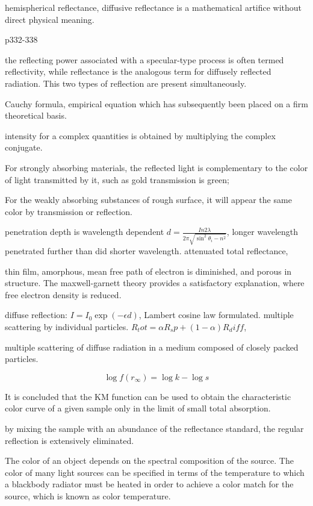 hemispherical reflectance, 
diffusive reflectance is a mathematical artifice without direct physical meaning. 

p332-338

the reflecting power associated with a specular-type process is often termed reflectivity, while reflectance is the analogous term for diffusely reflected radiation. This two types of reflection are present simultaneously. 

Cauchy formula, empirical equation which has subsequently been placed on a firm theoretical basis. 

intensity for a complex quantities is obtained by multiplying the complex conjugate. 

For strongly absorbing materials, the reflected light is complementary to the color of light transmitted by it, such as gold transmission is green; 

For the weakly absorbing substances of rough surface, it will appear the same color by transmission or reflection. 

penetration depth is wavelength dependent $d = \frac{In2 \lambda}{2\pi \sqrt{\sin^2\theta_i - n^2}}$, longer wavelength penetrated further than did shorter wavelength. attenuated total reflectance, 

thin film, amorphous, mean free path of electron is diminished, and porous in structure. The maxwell-garnett theory provides a satisfactory explanation, where free electron density is reduced. 

diffuse reflection: $I = I_0 \exp(-\epsilon d)$, Lambert cosine law formulated. multiple scattering by individual particles. 
$R_tot = \alpha R_sp + (1- \alpha) R_diff $, 

multiple scattering of diffuse radiation in a medium composed of closely packed particles. 

\[
\log{f(r_\infty) = \log{k} - \log{s}}
\]

It is concluded that the KM function can be used to obtain the characteristic color curve of a given sample only in the limit of small total absorption. 

by mixing the sample with an abundance of the reflectance standard, the regular reflection is extensively eliminated. 

The color of an object depends on the spectral composition of the source. The color of many light sources can be specified in terms of the temperature to which a blackbody radiator must be heated in order to achieve a color match for the source, which is known as color temperature. 

